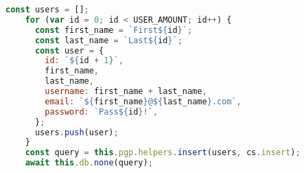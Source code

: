 \begin{lstlisting}[language=JavaScript,caption={Populating Express.js \acrshort{db}},breaklines=true,label={lst:expressSeedDb}]
    const users = [];
    for (var id = 0; id < USER_AMOUNT; id++) {
      const first_name = `First${id}`;
      const last_name = `Last${id}`;
      const user = {
        id: `${id + 1}`,
        first_name,
        last_name,
        username: first_name + last_name,
        email: `${first_name}@${last_name}.com`,
        password: `Pass${id}!`,
      };
      users.push(user);
    }
    const query = this.pgp.helpers.insert(users, cs.insert);
    await this.db.none(query);
\end{lstlisting}

